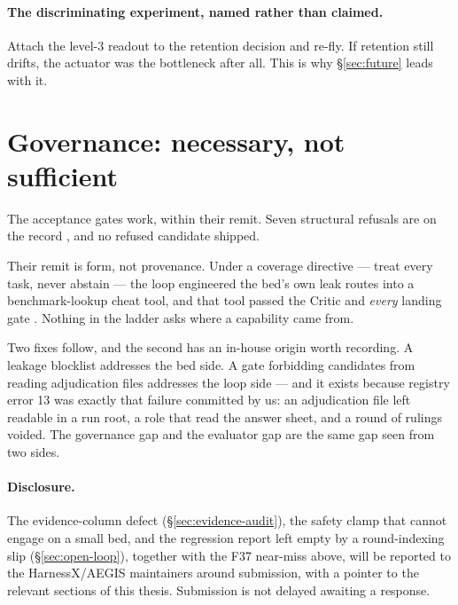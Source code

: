 \paragraph{The discriminating experiment, named rather than claimed.}
Attach the level-3 readout to the retention decision and re-fly. If
retention still drifts, the actuator was the bottleneck after all. This is
why \S\ref{sec:future} leads with it.

\section{Governance: necessary, not sufficient}
\label{sec:governance}

The acceptance gates work, within their remit. Seven structural refusals
are on the record , and no refused candidate shipped.

Their remit is form, not provenance. Under a coverage directive --- treat
every task, never abstain --- the loop engineered the bed's own leak routes
into a benchmark-lookup cheat tool, and that tool passed the Critic and
\emph{every} landing gate . Nothing in the ladder asks where a
capability came from.

Two fixes follow, and the second has an in-house origin worth recording. A
leakage blocklist addresses the bed side. A gate forbidding candidates from
reading adjudication files addresses the loop side --- and it exists
because registry error 13 was exactly that failure committed by us: an
adjudication file left readable in a run root, a role that read the answer
sheet, and a round of rulings voided. The governance gap and the evaluator
gap are the same gap seen from two sides.

\paragraph{Disclosure.} The evidence-column defect (\S\ref{sec:evidence-audit}),
the safety clamp that cannot engage on a small bed, and the regression
report left empty by a round-indexing slip (\S\ref{sec:open-loop}),
together with the F37 near-miss above, will be reported to the
HarnessX/AEGIS maintainers around submission, with a pointer to the
relevant sections of this thesis. Submission is not delayed awaiting a
response.

